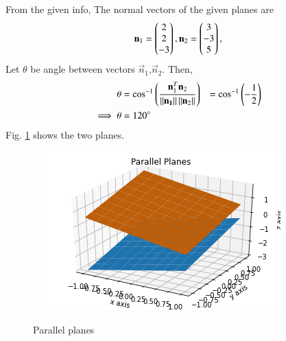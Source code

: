 From the given info, 
The normal vectors of the given planes are 
\begin{equation}
 \mathbf n_1=\begin{pmatrix}2\\2\\-3\end{pmatrix},
 \mathbf n_2 =\begin{pmatrix}3\\-3\\5\end{pmatrix},
\end{equation}
%
Let $\theta$ be angle between vectors $\vec{n}_1$,$\vec{n}_2$.  Then,
\begin{align}
    \theta &= \cos^{-1}\left({\frac{\mathbf{n}_1^{T}\mathbf{n}_2}{\left\lVert\mathbf{n_1}\right\rVert\left\lVert\mathbf{n}_2\right\rVert}}\right)
 &=\cos^{-1}\left(-\frac{1}{2}\right)\\
\implies \theta &= 120\degree
\end{align}
Fig.     \ref{linform/42/fig: PARALLEL planes.}  shows the two planes.
\begin{figure}[ht]
    \centering
   \includegraphics[width=\columnwidth]{solutions/su2021/2/42/Figure3.png}
    \caption{Parallel planes}
    \label{linform/42/fig: PARALLEL planes.}
\end{figure}    

  
 







